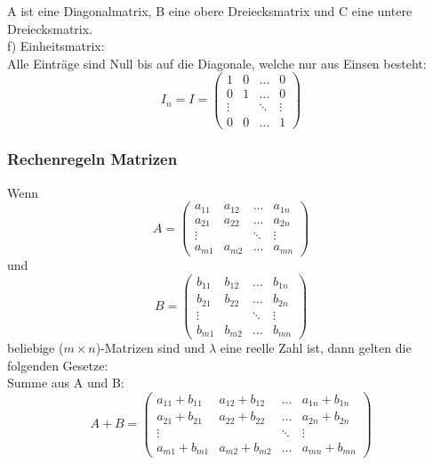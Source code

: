 \documentclass[10pt]{scrartcl}
\begin{document}
\begin{multicols}{2}
\begin{equation}
\end{equation}
A ist eine Diagonalmatrix, B eine obere Dreiecksmatrix und C eine untere Dreiecksmatrix.\\
f) Einheitsmatrix:\\
Alle Einträge sind Null bis auf die Diagonale, welche nur aus Einsen besteht:
\begin{equation}
I_n = I = \begin{pmatrix}
1 & 0 & \dots &  0\\
0 & 1 & \dots &  0 \\
\vdots & & \ddots & \vdots\\
0 & 0 & \dots & 1
\end{pmatrix}
\end{equation}
\subsubsection*{Rechenregeln Matrizen}
Wenn
\begin{equation}
A = \begin{pmatrix}
a_{11} & a_{12} & \dots & a_{1n}\\
a_{21} & a_{22} & \dots & a_{2n}\\
\vdots & & \ddots & \vdots\\
a_{m1} & a_{m2} & \dots & a_{mn}
\end{pmatrix}
\end{equation} und
\begin{equation}
B = \begin{pmatrix}
b_{11} & b_{12} & \dots & b_{1n}\\
b_{21} & b_{22} & \dots & b_{2n}\\
\vdots & & \ddots & \vdots\\
b_{m1} & b_{m2} & \dots & b_{mn}
\end{pmatrix}
\end{equation}
beliebige ($m \times n$)-Matrizen sind und $\lambda$ eine reelle Zahl ist, dann gelten die folgenden Gesetze:\\
Summe aus A und B:
\begin{equation}
A + B = \begin{pmatrix}
a_{11} + b_{11} & a_{12} + b_{12} & \dots & a_{1n} + b_{1n}\\
a_{21} + b_{21} & a_{22} + b_{22} & \dots & a_{2n} + b_{2n}\\
\vdots & & \ddots & \vdots\\
a_{m1} + b_{m1} & a_{m2} + b_{m2} & \dots & a_{mn} + b_{mn}
\end{pmatrix}

\end{equation}
\end{multicols}
\end{document}
